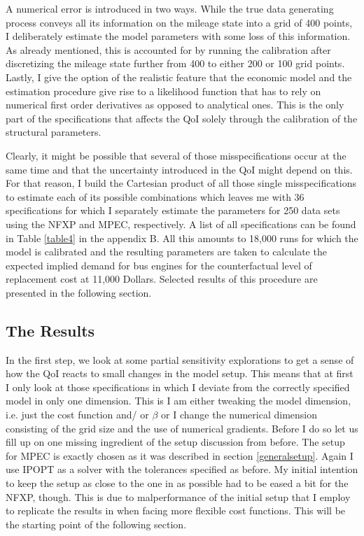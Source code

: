 A numerical error is introduced in two ways. While the true data generating process conveys all its information on the mileage state into a grid of 400 points, I deliberately estimate the model parameters with some loss of this information. As already mentioned, this is accounted for by running the calibration after discretizing the mileage state further from 400 to either 200 or 100 grid points. Lastly, I give the option of the realistic feature that the economic model and the estimation procedure give rise to a likelihood function that has to rely on numerical first order derivatives as opposed to analytical ones. This is the only part of the specifications that affects the QoI solely through the calibration of the structural parameters.

Clearly, it might be possible that several of those misspecifications occur at the same time and that the uncertainty introduced in the QoI might depend on this. For that reason, I build the Cartesian product of all those single misspecifications to estimate each of its possible combinations which leaves me with 36 specifications for which I separately estimate the parameters for 250 data sets using the NFXP and MPEC, respectively. A list of all specifications can be found in Table \ref{table4} in the appendix B. All this amounts to 18,000 runs for which the model is calibrated and the resulting parameters are taken to calculate the expected implied demand for bus engines for the counterfactual level of replacement cost at 11,000 Dollars. Selected results of this procedure are presented in the following section.

\subsection{The Results}

In the first step, we look at some partial sensitivity explorations to get a sense of how the QoI reacts to small changes in the model setup. This means that at first I only look at those specifications in which I deviate from the correctly specified model in only one dimension. This is I am either tweaking the model dimension, i.e. just the cost function and/ or $\beta$ or I change the numerical dimension consisting of the grid size and the use of numerical gradients. Before I do so let us fill up on one missing ingredient of the setup discussion from before. The setup for MPEC is exactly chosen as it was described in section \ref{generalsetup}. Again I use IPOPT as a solver with the tolerances specified as before. My initial intention to keep the setup as close to the one in \cite{Iskhakov.2016} as possible had to be eased a bit for the NFXP, though. This is due to malperformance of the initial setup that I employ to replicate the results in \cite{Iskhakov.2016} when facing more flexible cost functions. This will be the starting point of the following section.

